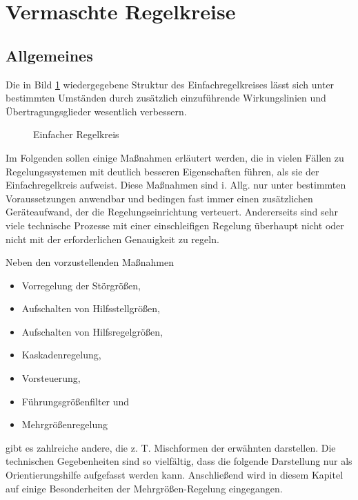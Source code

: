 \section{Vermaschte Regelkreise}


\subsection{Allgemeines}

Die in Bild \ref{fig:7-1} wiedergegebene Struktur des Einfachregelkreises lässt sich unter bestimmten Umständen durch zusätzlich einzuführende Wirkungslinien und Übertragungsglieder wesentlich verbessern.

\begin{figure}[ht]
    \centering
    \caption{Einfacher Regelkreis}
    \label{fig:7-1}
\end{figure}

Im Folgenden sollen einige Maßnahmen erläutert werden, die in vielen Fällen zu Regelungssystemen mit deutlich besseren Eigenschaften führen, als sie der Einfachregelkreis aufweist.
Diese Maßnahmen sind i. Allg. nur unter bestimmten Voraussetzungen anwendbar und bedingen fast immer einen zusätzlichen Geräteaufwand, der die Regelungseinrichtung verteuert.
Andererseits sind sehr viele technische Prozesse mit einer einschleifigen Regelung überhaupt nicht oder nicht mit der erforderlichen Genauigkeit zu regeln.

Neben den vorzustellenden Maßnahmen
\begin{itemize}
	\item Vorregelung der Störgrößen,
	\item Aufschalten von Hilfsstellgrößen,
	\item Aufschalten von Hilfsregelgrößen,
	\item Kaskadenregelung,
	\item Vorsteuerung,
	\item Führungsgrößenfilter und
	\item Mehrgrößenregelung
\end{itemize}
gibt es zahlreiche andere, die z. T. Mischformen der erwähnten darstellen.
Die technischen Gegebenheiten sind so vielfältig, dass die folgende Darstellung nur als Orientierungshilfe aufgefasst werden kann.
Anschließend wird in diesem Kapitel auf einige Besonderheiten der Mehrgrößen-Regelung eingegangen.


